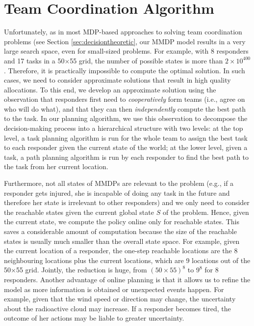 \section{Team Coordination Algorithm}\label{sec:algo}
\noindent Unfortunately, as in most MDP-based approaches to solving team coordination problems (see Section \ref{sec:decisiontheoretic}, our  MMDP model results in a very large search space,
even for small-sized problems. For example, with 8 responders and
17 tasks in a 50$\times$55 grid, the number of possible states is
more than $2\times 10^{400}$. Therefore, it is practically
impossible to compute the optimal solution. In such cases, we need
to consider approximate solutions that result in high quality
allocations.  To this end, we develop an
approximate solution using  the observation that responders first need to {\em cooperatively}  form teams (i.e., agree on who will do what),
and  that they can then {\em independently} compute the best path to the task.
In our planning algorithm, we use this observation to decompose the
decision-making process into a hierarchical structure with two
levels: at the top level, a task planning algorithm is run for the
whole team to assign the best task to each responder given the
current state of the world; at the lower level, given a task, a
path planning algorithm is run by each responder to find the best
path to the task from her current location.

Furthermore, not all states of MMDPs are relevant to the problem
(e.g., if a responder gets injured, she is incapable of doing any
task in the future and therefore her state is irrelevant
to other responders) and we only need to consider the reachable
states given the current global state $S$ of the problem. Hence,
given the current state, we compute the policy online only for
reachable states. This saves a considerable amount of computation
because the size of the reachable states is usually much smaller
than the overall state space. For example, given the current
location of a responder, the one-step reachable locations are the 8
neighbouring locations plus the current locations, which are 9
locations out of the 50$\times$55 grid. Jointly, the reduction is
huge, from $(50\times 55)^8$ to $9^8$ for 8 responders. Another
advantage of online planning is that it allows us to refine the
model as more information is obtained or unexpected events happen.
For example, given that the wind speed or  direction 
 may change, the uncertainty about the radioactive cloud may increase.
If a responder becomes tired, the outcome of  her actions may
be liable to greater uncertainty.

